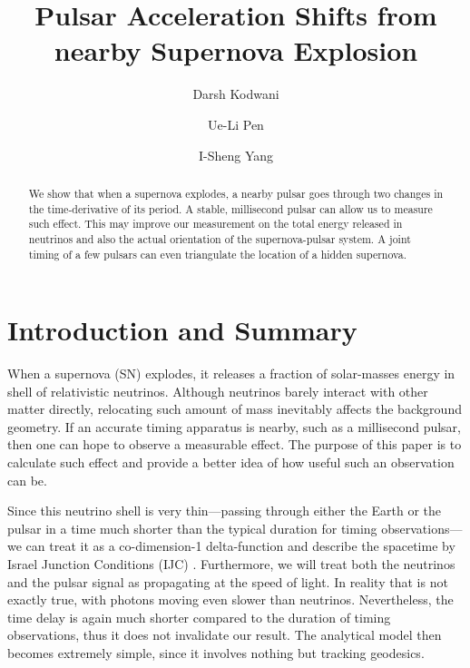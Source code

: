\documentclass[aps,showpacs,twocolumn,floats,prd,superscriptaddress,nofootinbib]{revtex4-1}
\begin{document}
\title{Pulsar Acceleration Shifts from nearby Supernova Explosion}

\author{Darsh Kodwani}

\author{Ue-Li Pen}

\author{I-Sheng Yang}

\begin{abstract}
We show that when a supernova explodes, a nearby pulsar goes through two changes in the time-derivative of its period. A stable, millisecond pulsar can allow us to measure such effect. This may improve our measurement on the total energy released in neutrinos and also the actual orientation of the supernova-pulsar system. A joint timing of a few pulsars can even triangulate the location of a hidden supernova.
\end{abstract}

\maketitle

\section{Introduction and Summary}

When a supernova (SN) explodes, it releases a fraction of solar-masses energy in shell of relativistic neutrinos. Although neutrinos barely interact with other matter directly, relocating such amount of mass inevitably affects the background geometry. If an accurate timing apparatus is nearby, such as a millisecond pulsar, then one can hope to observe a measurable effect. The purpose of this paper is to calculate such effect and provide a better idea of how useful such an observation can be.

Since this neutrino shell is very thin---passing through either the Earth or the pulsar in a time much shorter than the typical duration for timing observations---we can treat it as a co-dimension-1 delta-function and describe the spacetime by Israel Junction Conditions (IJC) \cite{Isr66}. Furthermore, we will treat both the neutrinos and the pulsar signal as propagating at the speed of light. In reality that is not exactly true, with photons moving even slower than neutrinos. Nevertheless, the time delay is again much shorter compared to the duration of timing observations, thus it does not invalidate our result. The analytical model then becomes extremely simple, since it involves nothing but tracking geodesics\cite{BouFre07,JohYan10}.
\end{document}

